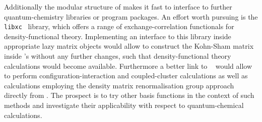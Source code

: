 Additionally the modular structure of \molsturm
makes it fast to interface to
further quantum-chemistry libraries or program packages.
An effort worth pursuing is the \texttt{libxc}~\cite{Lehtola2018} library,
which offers a range of exchange-correlation functionals
for density-functional theory.
Implementing an interface to this library inside appropriate
lazy matrix objects would allow to construct the Kohn-Sham matrix
inside \molsturm's \SCF without any further changes,
such that density-functional theory calculations would become available.
Furthermore a better link to \pyscf~\cite{Sun2017}
would allow to perform configuration-interaction
and coupled-cluster calculations as well as calculations
employing the density matrix renormalisation group approach
directly from \molsturm.
The prospect is to try other basis functions
in the context of such methods
and investigate their applicability with respect to quantum-chemical
calculations.



